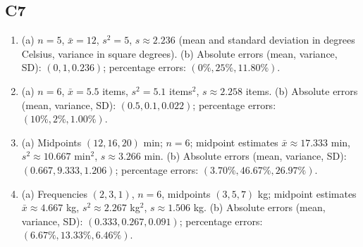 {\subsection*{C7}
\begin{enumerate}[label=\textbf{C7.\arabic*.}]
\item (a) $n=5$, $\bar{x}=12$, $s^2=5$, $s\approx2.236$
(mean and standard deviation in degrees Celsius, variance in square degrees).
(b) Absolute errors (mean, variance, SD): $(0,1,0.236)$; percentage errors: $(0\%,25\%,11.80\%)$.
\item (a) $n=6$, $\bar{x}=5.5$ items, $s^2=5.1$ items$^2$,
$s\approx2.258$ items.
(b) Absolute errors (mean, variance, SD): $(0.5,0.1,0.022)$; percentage errors: $(10\%,2\%,1.00\%)$.
\item (a) Midpoints $(12,16,20)$ min; $n=6$; midpoint estimates
$\bar{x}\approx17.333$ min, $s^2\approx10.667$ min$^2$,
$s\approx3.266$ min.
(b) Absolute errors (mean, variance, SD): $(0.667,9.333,1.206)$; percentage errors: $(3.70\%,46.67\%,26.97\%)$.
\item (a) Frequencies $(2,3,1)$, $n=6$, midpoints $(3,5,7)$ kg;
midpoint estimates $\bar{x}\approx4.667$ kg, $s^2\approx2.267$ kg$^2$,
$s\approx1.506$ kg.
(b) Absolute errors (mean, variance, SD): $(0.333,0.267,0.091)$; percentage errors: $(6.67\%,13.33\%,6.46\%)$.
\end{enumerate}
}


